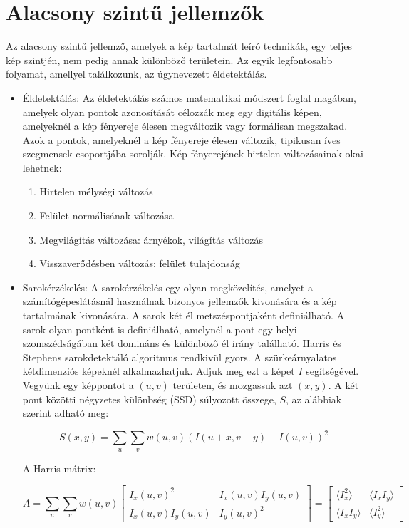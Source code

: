 \section{Alacsony szintű jellemzők}
Az alacsony szintű jellemző\cite{features27:online}, amelyek a kép tartalmát leíró technikák, egy teljes kép szintjén, nem pedig annak különböző területein. Az egyik legfontosabb folyamat, amellyel találkozunk, az úgynevezett éldetektálás.
\begin{itemize}
\item Éldetektálás: Az éldetektálás számos matematikai módszert foglal magában, amelyek olyan pontok azonosítását célozzák meg egy digitális képen, amelyeknél a kép fényereje élesen megváltozik vagy formálisan megszakad. Azok a pontok, amelyeknél a kép fényereje élesen változik, tipikusan íves szegmensek csoportjába sorolják.
Kép fényerejének hirtelen változásainak okai lehetnek:
\begin{enumerate}
\item Hirtelen mélységi változás
\item Felület normálisának változása
\item Megvilágítás változása: árnyékok, világítás változás
\item Visszaverődésben változás: felület tulajdonság
\end{enumerate}
\item Sarokérzékelés: A sarokérzékelés egy olyan megközelítés, amelyet a számítógépeslátásnál használnak bizonyos jellemzők kivonására és a kép tartalmának kivonására.
A sarok két él metszéspontjaként definiálható. A sarok olyan pontként is definiálható, amelynél a pont egy helyi szomszédságában két domináns és különböző él irány található.
Harris és Stephens sarokdetektáló algoritmus rendkivül gyors. A szürkeárnyalatos kétdimenziós képeknél alkalmazhatjuk. Adjuk meg ezt a képet $I$ segítségével. Vegyünk egy képpontot a $(u, v)$ területen, és mozgassuk azt $(x, y)$. A két pont közötti négyzetes különbség (SSD) súlyozott összege, $S$, az alábbiak szerint adható meg:

$$
S(x,y)=\sum_{u}\sum_{v}w(u,v)(I(u+x,v+y)-I(u,v))^{2}
$$

A Harris mátrix:

$$
{\displaystyle A=\sum _{u}\sum _{v}w(u,v){\begin{bmatrix}I_{x}(u,v)^{2}&I_{x}(u,v)I_{y}(u,v)\\I_{x}(u,v)I_{y}(u,v)&I_{y}(u,v)^{2}\end{bmatrix}}={\begin{bmatrix}\langle I_{x}^{2}\rangle &\langle I_{x}I_{y}\rangle \\\langle I_{x}I_{y}\rangle &\langle I_{y}^{2}\rangle \end{bmatrix}}}
$$


\end{itemize}
